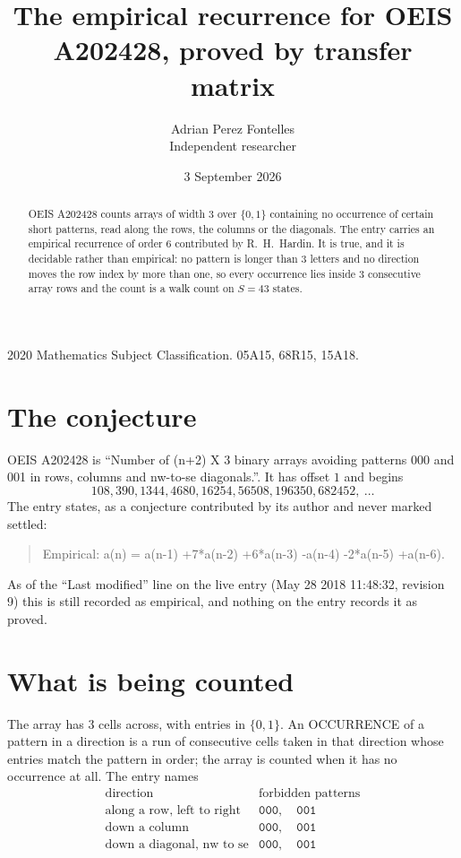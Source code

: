 \documentclass[11pt,a4paper]{article}
\title{The empirical recurrence for OEIS A202428, proved by transfer matrix}
\author{Adrian Perez Fontelles\\ \small Independent researcher}
\date{3 September 2026}
\theoremstyle{plain}
\theoremstyle{definition}
\begin{document}
\maketitle

\begin{abstract}
OEIS A202428 counts arrays of width $3$ over $\{0,1\}$ containing no occurrence of certain short
patterns, read along the rows, the columns or the diagonals. The entry carries an empirical
recurrence of order $6$ contributed by R.~H.~Hardin. It is true, and it is decidable
rather than empirical: no pattern is longer than $3$ letters and no direction moves the row
index by more than one, so every occurrence lies inside $3$ consecutive array rows and the
count is a walk count on $S=43$ states.
\end{abstract}

\noindent\small 2020 Mathematics Subject Classification. 05A15, 68R15, 15A18.\normalsize

\section{The conjecture}

OEIS A202428 is ``Number of (n+2) X 3 binary arrays avoiding patterns 000 and 001 in rows, columns and nw-to-se diagonals.''. It has offset $1$ and begins
\[
108, 390, 1344, 4680, 16254, 56508, 196350, 682452,\ \dots
\]
The entry states, as a conjecture contributed by its author and never marked settled:
\begin{quote}
Empirical: a(n) = a(n-1) +7*a(n-2) +6*a(n-3) -a(n-4) -2*a(n-5) +a(n-6).
\end{quote}
As of the ``Last modified'' line on the live entry (May 28 2018 11:48:32, revision 9) this is still
recorded as empirical, and nothing on the entry records it as proved.

\section{What is being counted}

The array has $3$ cells across, with entries in $\{0,1\}$. An OCCURRENCE of a pattern in a
direction is a run of consecutive cells taken in that direction whose entries match the pattern
in order; the array is counted when it has no occurrence at all. The entry names
\[
\begin{array}{ll}
\text{direction} & \text{forbidden patterns} \\[2pt]
\text{along a row, left to right} & \mathtt{000},\quad \mathtt{001} \\
\text{down a column} & \mathtt{000},\quad \mathtt{001} \\
\text{down a diagonal, nw to se} & \mathtt{000},\quad \mathtt{001} \\
\end{array}
\]
\end{document}

